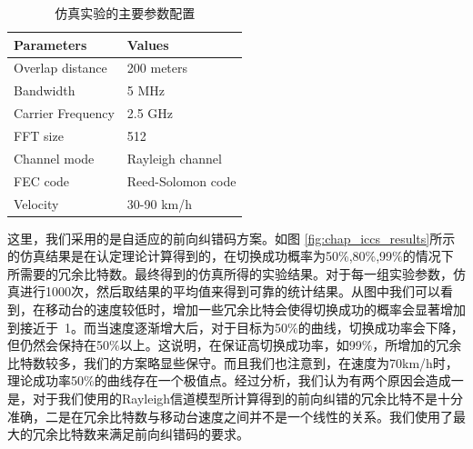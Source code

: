 \begin{table}[h]
\centering
\caption{仿真实验的主要参数配置}\label{chap_iccs_table_I}
\begin{tabular*}{0.99\textwidth}{p{7cm} p{7cm}} 
\toprule 
Parameters  &  Values \\
\midrule
Overlap distance  & 200 meters\tabularnewline 
Bandwidth  & 5 MHz\tabularnewline 
Carrier Frequency  & 2.5 GHz\tabularnewline 
FFT size  & 512\tabularnewline
Channel mode  & Rayleigh channel\tabularnewline 
FEC code  & Reed-Solomon code\tabularnewline 
Velocity  & 30-90 km/h\\
\bottomrule
\end{tabular*}
\end{table}

这里，我们采用的是自适应的前向纠错码方案。如图 \ref{fig:chap_iccs_results}所示的仿真结果是在认定理论计算得到的，在切换成功概率为50\%,80\%,99\%的情况下所需要的冗余比特数。最终得到的仿真所得的实验结果。对于每一组实验参数，仿真进行1000次，然后取结果的平均值来得到可靠的统计结果。从图中我们可以看到，在移动台的速度较低时，增加一些冗余比特会使得切换成功的概率会显著增加到接近于~1。而当速度逐渐增大后，对于目标为50\%的曲线，切换成功率会下降，但仍然会保持在50\%以上。这说明，在保证高切换成功率，如99\%，所增加的冗余比特数较多，我们的方案略显些保守。而且我们也注意到，在速度为70km/h时，理论成功率50\%的曲线存在一个极值点。经过分析，我们认为有两个原因会造成一是，对于我们使用的Rayleigh信道模型所计算得到的前向纠错的冗余比特不是十分准确，二是在冗余比特数与移动台速度之间并不是一个线性的关系。我们使用了最大的冗余比特数来满足前向纠错码的要求。

